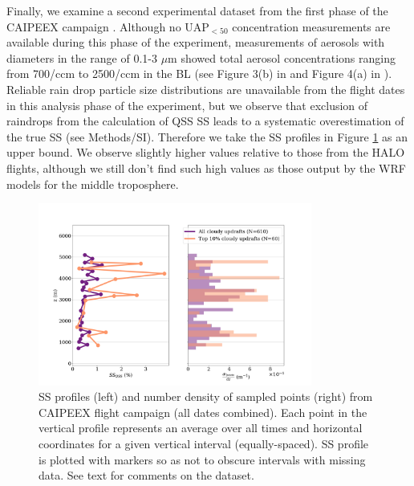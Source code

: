 \documentclass{article}
\begin{document}
Finally, we examine a second experimental dataset from the first phase of the CAIPEEX campaign \cite{Kulkarni2012}. Although no UAP$_{<50}$ concentration measurements are available during this phase of the experiment, measurements of aerosols with diameters in the range of 0.1-3 $\mu$m showed total aerosol concentrations ranging from 700/ccm to 2500/ccm in the BL (see Figure 3(b) in \cite{Prabha2011} and Figure 4(a) in \cite{Kulkarni2012}). Reliable rain drop particle size distributions are unavailable from the flight dates in this analysis phase of the experiment, but we observe that exclusion of raindrops from the calculation of QSS SS leads to a systematic overestimation of the true SS (see Methods/SI). Therefore we take the SS profiles in Figure \ref{caipeexbipanel} as an upper bound. We observe slightly higher values relative to those from the HALO flights, although we still don't find such high values as those output by the WRF models for the middle troposphere.


\begin{figure}[ht]
    \centering
    \includegraphics[width=9cm]{revcaipeex/v4_FINAL_combined_bipanel_ss_qss_vs_z_figure.png}
    \caption{SS profiles (left) and number density of sampled points (right) from CAIPEEX flight campaign (all dates combined). Each point in the vertical profile represents an average over all times and horizontal coordinates for a given vertical interval (equally-spaced). SS profile is plotted with markers so as not to obscure intervals with missing data. See text for comments on the dataset.}
    \label{caipeexbipanel}
\end{figure}
\end{document}
